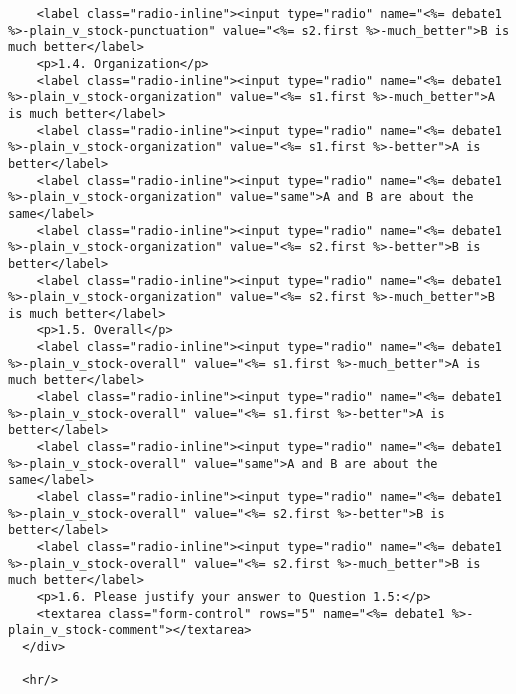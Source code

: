 \documentclass{article}
\begin{document}
\begin{verbatim}
    <label class="radio-inline"><input type="radio" name="<%= debate1 %>-plain_v_stock-punctuation" value="<%= s2.first %>-much_better">B is much better</label>
    <p>1.4. Organization</p>
    <label class="radio-inline"><input type="radio" name="<%= debate1 %>-plain_v_stock-organization" value="<%= s1.first %>-much_better">A is much better</label>
    <label class="radio-inline"><input type="radio" name="<%= debate1 %>-plain_v_stock-organization" value="<%= s1.first %>-better">A is better</label>
    <label class="radio-inline"><input type="radio" name="<%= debate1 %>-plain_v_stock-organization" value="same">A and B are about the same</label>
    <label class="radio-inline"><input type="radio" name="<%= debate1 %>-plain_v_stock-organization" value="<%= s2.first %>-better">B is better</label>
    <label class="radio-inline"><input type="radio" name="<%= debate1 %>-plain_v_stock-organization" value="<%= s2.first %>-much_better">B is much better</label>
    <p>1.5. Overall</p>
    <label class="radio-inline"><input type="radio" name="<%= debate1 %>-plain_v_stock-overall" value="<%= s1.first %>-much_better">A is much better</label>
    <label class="radio-inline"><input type="radio" name="<%= debate1 %>-plain_v_stock-overall" value="<%= s1.first %>-better">A is better</label>
    <label class="radio-inline"><input type="radio" name="<%= debate1 %>-plain_v_stock-overall" value="same">A and B are about the same</label>
    <label class="radio-inline"><input type="radio" name="<%= debate1 %>-plain_v_stock-overall" value="<%= s2.first %>-better">B is better</label>
    <label class="radio-inline"><input type="radio" name="<%= debate1 %>-plain_v_stock-overall" value="<%= s2.first %>-much_better">B is much better</label>
    <p>1.6. Please justify your answer to Question 1.5:</p>
    <textarea class="form-control" rows="5" name="<%= debate1 %>-plain_v_stock-comment"></textarea>
  </div>

  <hr/>


\end{verbatim}
\end{document}
